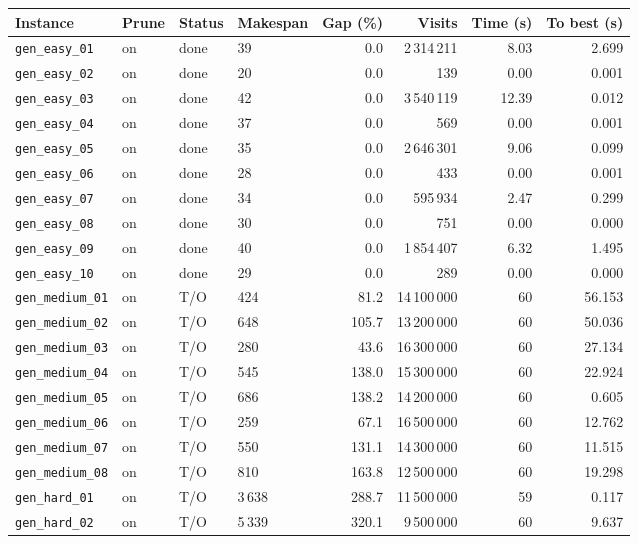 \begin{tabular}{llllrrrr}
\toprule
Instance & Prune & Status & Makespan & Gap (\%) & Visits & Time (s) & To best (s) \\
\midrule
\texttt{gen\_easy\_01} & on & done & 39 & 0.0 & 2\,314\,211 & 8.03 & 2.699 \\
\texttt{gen\_easy\_02} & on & done & 20 & 0.0 & 139 & 0.00 & 0.001 \\
\texttt{gen\_easy\_03} & on & done & 42 & 0.0 & 3\,540\,119 & 12.39 & 0.012 \\
\texttt{gen\_easy\_04} & on & done & 37 & 0.0 & 569 & 0.00 & 0.001 \\
\texttt{gen\_easy\_05} & on & done & 35 & 0.0 & 2\,646\,301 & 9.06 & 0.099 \\
\texttt{gen\_easy\_06} & on & done & 28 & 0.0 & 433 & 0.00 & 0.001 \\
\texttt{gen\_easy\_07} & on & done & 34 & 0.0 & 595\,934 & 2.47 & 0.299 \\
\texttt{gen\_easy\_08} & on & done & 30 & 0.0 & 751 & 0.00 & 0.000 \\
\texttt{gen\_easy\_09} & on & done & 40 & 0.0 & 1\,854\,407 & 6.32 & 1.495 \\
\texttt{gen\_easy\_10} & on & done & 29 & 0.0 & 289 & 0.00 & 0.000 \\
\texttt{gen\_medium\_01} & on & T/O & 424 & 81.2 & 14\,100\,000 & 60 & 56.153 \\
\texttt{gen\_medium\_02} & on & T/O & 648 & 105.7 & 13\,200\,000 & 60 & 50.036 \\
\texttt{gen\_medium\_03} & on & T/O & 280 & 43.6 & 16\,300\,000 & 60 & 27.134 \\
\texttt{gen\_medium\_04} & on & T/O & 545 & 138.0 & 15\,300\,000 & 60 & 22.924 \\
\texttt{gen\_medium\_05} & on & T/O & 686 & 138.2 & 14\,200\,000 & 60 & 0.605 \\
\texttt{gen\_medium\_06} & on & T/O & 259 & 67.1 & 16\,500\,000 & 60 & 12.762 \\
\texttt{gen\_medium\_07} & on & T/O & 550 & 131.1 & 14\,300\,000 & 60 & 11.515 \\
\texttt{gen\_medium\_08} & on & T/O & 810 & 163.8 & 12\,500\,000 & 60 & 19.298 \\
\texttt{gen\_hard\_01} & on & T/O & 3\,638 & 288.7 & 11\,500\,000 & 59 & 0.117 \\
\texttt{gen\_hard\_02} & on & T/O & 5\,339 & 320.1 & 9\,500\,000 & 60 & 9.637 \\
\bottomrule
\end{tabular}
